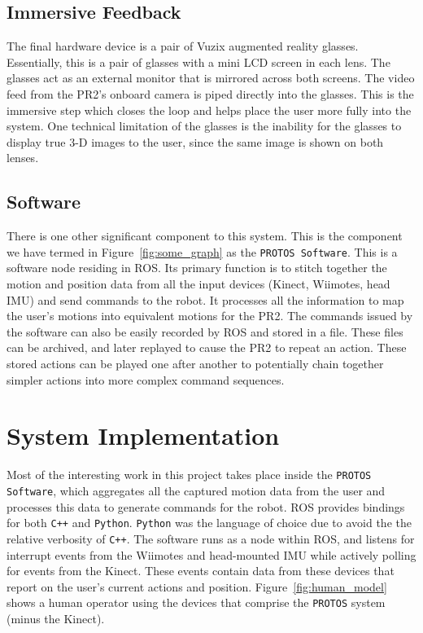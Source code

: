 \documentclass{sig-alternate}
\begin{document}
\subsection{Immersive Feedback}
\label{sec:model_feedback}
The final hardware device is a pair of Vuzix augmented reality glasses.
Essentially, this is a pair of glasses with a mini LCD screen in each lens. The glasses act as
an external monitor that is mirrored across both screens. 
The video feed from the PR2's onboard camera is piped
directly into the glasses. This is the immersive step which closes the loop and
helps place the user more fully into the system. One technical limitation of the glasses is
the inability for the glasses to display true 3-D images to the user, since the same image is
shown on both lenses.

\subsection{Software}
\label{sec:model_software}
There is one other significant component to this system. This is the
component we have
termed in Figure~\ref{fig:some_graph} as the {\tt PROTOS Software}. This is a 
software node residing in ROS. Its primary function is to stitch together the
motion and position data from all the input devices (Kinect, Wiimotes, head 
IMU) and send commands to the robot. It processes all the information to map the user's motions
into equivalent motions for the PR2. The commands issued by the software can also be easily recorded by 
ROS and stored in a file. These files can be archived, and later replayed to cause the PR2 to repeat an action.
These stored actions can be played one after another to potentially chain together simpler actions into
more complex command sequences.

\section{System Implementation}
\label{sec:system_implementation}
Most of the interesting work in this project takes place inside the
{\tt PROTOS Software}, which aggregates all the captured motion data from the
user and processes this data to generate commands for the robot. ROS provides
bindings for both {\tt C++} and {\tt Python}. {\tt Python} was the language of choice due to avoid
the the relative verbosity of {\tt C++}.
The software runs as a node within ROS, and listens for interrupt events from the Wiimotes and head-mounted
IMU while actively polling for events from the Kinect. These events contain data
from these devices that report on the user's current actions and position. Figure~\ref{fig:human_model} shows
a human operator using the devices that comprise the {\tt PROTOS} system (minus the Kinect).
\end{document}
